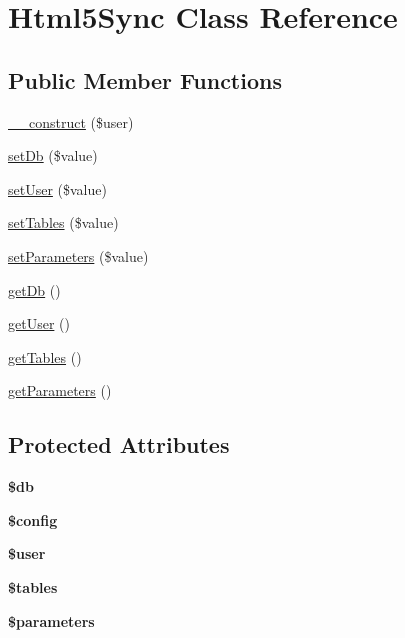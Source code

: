 \hypertarget{classHtml5Sync}{\section{Html5\-Sync Class Reference}
\label{classHtml5Sync}
}
\subsection*{Public Member Functions}
\begin{DoxyCompactItemize}
\item 
\hyperlink{classHtml5Sync_a86e9b7a339c295ddc1c2fdfd24f13b07}{\-\_\-\-\_\-construct} (\$user)
\item 
\hyperlink{classHtml5Sync_ac2f728f1eb0459e6a8cce3ccbf17784f}{set\-Db} (\$value)
\item 
\hyperlink{classHtml5Sync_afbd2b9660431cdafc863141a6de9a7fc}{set\-User} (\$value)
\item 
\hyperlink{classHtml5Sync_aba40da5dd7d2785eb1094809339cef51}{set\-Tables} (\$value)
\item 
\hyperlink{classHtml5Sync_a97feb00b4d972988b76429f2f9e2c5b8}{set\-Parameters} (\$value)
\item 
\hyperlink{classHtml5Sync_a1356632d25bfa0b992b372fee5e3ce44}{get\-Db} ()
\item 
\hyperlink{classHtml5Sync_a9a50644c08204e15ecb09c2ab2a7d12d}{get\-User} ()
\item 
\hyperlink{classHtml5Sync_a90997b196d7a4c180e9bc4aca7323fa2}{get\-Tables} ()
\item 
\hyperlink{classHtml5Sync_ac7432fde9d8aa141f8a3436a1978cea6}{get\-Parameters} ()
\end{DoxyCompactItemize}
\subsection*{Protected Attributes}
\begin{DoxyCompactItemize}
\item 
\hypertarget{classHtml5Sync_a430e00f45a343f1efeb33b5e9af14cbb}{{\bfseries \$db}}\label{classHtml5Sync_a430e00f45a343f1efeb33b5e9af14cbb}

\item 
\hypertarget{classHtml5Sync_a8b390dbf89f49662ad72c03758f51d40}{{\bfseries \$config}}\label{classHtml5Sync_a8b390dbf89f49662ad72c03758f51d40}

\item 
\hypertarget{classHtml5Sync_aec622537a3340f5367c969c4806990cb}{{\bfseries \$user}}\label{classHtml5Sync_aec622537a3340f5367c969c4806990cb}

\item 
\hypertarget{classHtml5Sync_a438285be83079489c1d791171ad872be}{{\bfseries \$tables}}\label{classHtml5Sync_a438285be83079489c1d791171ad872be}

\item 
\hypertarget{classHtml5Sync_af93e02013382129e39e3ff472f06f6da}{{\bfseries \$parameters}}\label{classHtml5Sync_af93e02013382129e39e3ff472f06f6da}

\end{DoxyCompactItemize}


